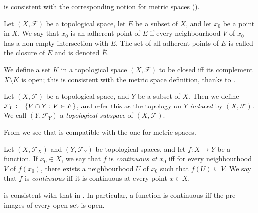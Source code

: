\begin{note}
   is consistent with the corresponding notion for metric spaces ().
\end{note}

\begin{defn}[Closure]\label{ii:2.5.6}
  Let \((X, \mathcal{F})\) be a topological space, let \(E\) be a subset of \(X\), and let \(x_0\) be a point in \(X\).
  We say that \(x_0\) is an adherent point of \(E\) if every neighbourhood \(V\) of \(x_0\) has a non-empty intersection with \(E\).
  The set of all adherent points of \(E\) is called the closure of \(E\) and is denoted \(\overline{E}\).
\end{defn}

\begin{note}
  We define a set \(K\) in a topological space \((X, \mathcal{F})\) to be closed iff its complement \(X \setminus K\) is open;
  this is consistent with the metric space definition, thanks to .
\end{note}

\begin{defn}\label{ii:2.5.7}
  Let \((X, \mathcal{F})\) be a topological space, and \(Y\) be a subset of \(X\).
  Then we define \(\mathcal{F}_Y \coloneqq \left\lbrace V \cap Y : V \in F\right\rbrace\), and refer this as the topology on \(Y\) \emph{induced} by \((X, \mathcal{F})\).
  We call \((Y, \mathcal{F}_Y)\) a \emph{topological subspace} of \((X, \mathcal{F})\).
\end{defn}

\begin{note}
  From  we see that  is compatible with the one for metric spaces.
\end{note}

\begin{defn}\label{ii:2.5.8}
  Let \((X, \mathcal{F}_X)\) and \((Y, \mathcal{F}_Y)\) be topological spaces, and let \(f : X \to Y\) be a function.
  If \(x_0 \in X\), we say that \(f\) is \emph{continuous at} \(x_0\) iff for every neighbourhood \(V\) of \(f(x_0)\), there exists a neighbourhood \(U\) of \(x_0\) such that \(f(U) \subseteq V\).
  We say that \(f\) is \emph{continuous} iff it is continuous at every point \(x \in X\).
\end{defn}

\begin{note}
   is consistent with that in .
  In particular, a function is continuous iff the pre-images of every open set is open.
\end{note}

